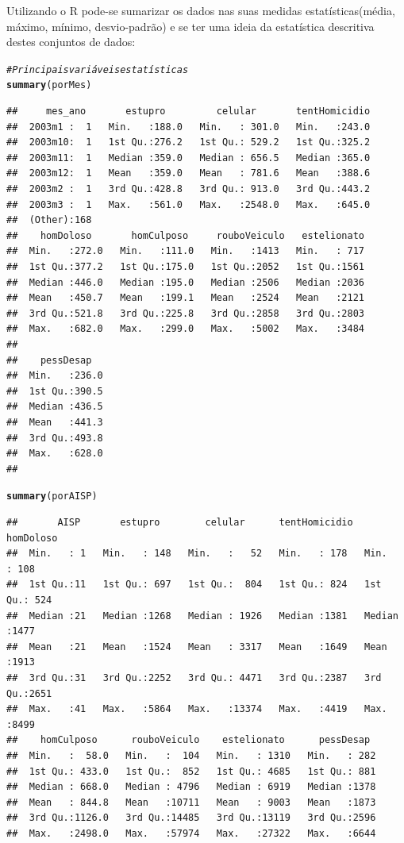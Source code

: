 \documentclass[a4paper, 12pt]{article}\usepackage[]{graphicx}\usepackage[]{color}
\makeatletter
\newcommand{\hlcom}[1]{\textcolor[rgb]{0.678,0.584,0.686}{\textit{#1}}}%
\newcommand{\hlstd}[1]{\textcolor[rgb]{0.345,0.345,0.345}{#1}}%
\newcommand{\hlkwd}[1]{\textcolor[rgb]{0.737,0.353,0.396}{\textbf{#1}}}%
\newenvironment{kframe}{%
 \def\at@end@of@kframe{}%
 \ifinner\ifhmode%
  \def\at@end@of@kframe{\end{minipage}}%
  \begin{minipage}{\columnwidth}%
 \fi\fi%
 \def\FrameCommand##1{\hskip\@totalleftmargin \hskip-\fboxsep
 \colorbox{shadecolor}{##1}\hskip-\fboxsep
     \hskip-\linewidth \hskip-\@totalleftmargin \hskip\columnwidth}%
 \MakeFramed {\advance\hsize-\width
   \@totalleftmargin\z@ \linewidth\hsize
   \@setminipage}}%
 {\par\unskip\endMakeFramed%
 \at@end@of@kframe}
\newenvironment{knitrout}{}{} %
\makeatother
\begin{document}
		\begin{multicols}{2}
		Utilizando o R pode-se sumarizar os dados nas suas medidas estatísticas(média, máximo, mínimo, desvio-padrão) e se ter uma ideia da estatística descritiva destes conjuntos de dados:
		\end{multicols}
\begin{knitrout}\footnotesize
{}\color{fgcolor}\begin{kframe}
\begin{alltt}
\hlcom{#Principais variáveis estatísticas}
\hlkwd{summary}\hlstd{(porMes)}
\end{alltt}
\begin{verbatim}
##     mes_ano       estupro         celular       tentHomicidio  
##  2003m1 :  1   Min.   :188.0   Min.   : 301.0   Min.   :243.0  
##  2003m10:  1   1st Qu.:276.2   1st Qu.: 529.2   1st Qu.:325.2  
##  2003m11:  1   Median :359.0   Median : 656.5   Median :365.0  
##  2003m12:  1   Mean   :359.0   Mean   : 781.6   Mean   :388.6  
##  2003m2 :  1   3rd Qu.:428.8   3rd Qu.: 913.0   3rd Qu.:443.2  
##  2003m3 :  1   Max.   :561.0   Max.   :2548.0   Max.   :645.0  
##  (Other):168                                                   
##    homDoloso       homCulposo     rouboVeiculo   estelionato  
##  Min.   :272.0   Min.   :111.0   Min.   :1413   Min.   : 717  
##  1st Qu.:377.2   1st Qu.:175.0   1st Qu.:2052   1st Qu.:1561  
##  Median :446.0   Median :195.0   Median :2506   Median :2036  
##  Mean   :450.7   Mean   :199.1   Mean   :2524   Mean   :2121  
##  3rd Qu.:521.8   3rd Qu.:225.8   3rd Qu.:2858   3rd Qu.:2803  
##  Max.   :682.0   Max.   :299.0   Max.   :5002   Max.   :3484  
##                                                               
##    pessDesap    
##  Min.   :236.0  
##  1st Qu.:390.5  
##  Median :436.5  
##  Mean   :441.3  
##  3rd Qu.:493.8  
##  Max.   :628.0  
## 
\end{verbatim}
\begin{alltt}
\hlkwd{summary}\hlstd{(porAISP)}
\end{alltt}
\begin{verbatim}
##       AISP       estupro        celular      tentHomicidio    homDoloso   
##  Min.   : 1   Min.   : 148   Min.   :   52   Min.   : 178   Min.   : 108  
##  1st Qu.:11   1st Qu.: 697   1st Qu.:  804   1st Qu.: 824   1st Qu.: 524  
##  Median :21   Median :1268   Median : 1926   Median :1381   Median :1477  
##  Mean   :21   Mean   :1524   Mean   : 3317   Mean   :1649   Mean   :1913  
##  3rd Qu.:31   3rd Qu.:2252   3rd Qu.: 4471   3rd Qu.:2387   3rd Qu.:2651  
##  Max.   :41   Max.   :5864   Max.   :13374   Max.   :4419   Max.   :8499  
##    homCulposo      rouboVeiculo    estelionato      pessDesap   
##  Min.   :  58.0   Min.   :  104   Min.   : 1310   Min.   : 282  
##  1st Qu.: 433.0   1st Qu.:  852   1st Qu.: 4685   1st Qu.: 881  
##  Median : 668.0   Median : 4796   Median : 6919   Median :1378  
##  Mean   : 844.8   Mean   :10711   Mean   : 9003   Mean   :1873  
##  3rd Qu.:1126.0   3rd Qu.:14485   3rd Qu.:13119   3rd Qu.:2596  
##  Max.   :2498.0   Max.   :57974   Max.   :27322   Max.   :6644
\end{verbatim}
\end{kframe}
\end{knitrout}
\end{document}
